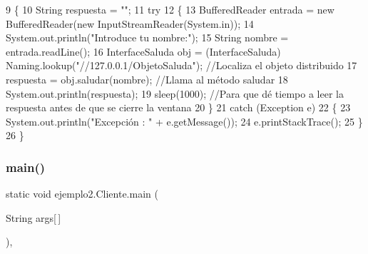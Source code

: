 \begin{DoxyCode}
9     \{
10         String respuesta = \textcolor{stringliteral}{""};
11         \textcolor{keywordflow}{try}
12         \{
13             BufferedReader entrada = \textcolor{keyword}{new} BufferedReader(\textcolor{keyword}{new} InputStreamReader(System.in));
14             System.out.println(\textcolor{stringliteral}{"Introduce tu nombre:"});
15             String nombre = entrada.readLine();
16             InterfaceSaluda obj = (InterfaceSaluda) Naming.lookup(\textcolor{stringliteral}{"//127.0.0.1/ObjetoSaluda"}); \textcolor{comment}{//Localiza
       el objeto distribuido}
17             respuesta = obj.saludar(nombre);                                                   \textcolor{comment}{//Llama al
       método saludar}
18             System.out.println(respuesta);
19             sleep(1000); \textcolor{comment}{//Para que dé tiempo a leer la respuesta antes de que se cierre la ventana}
20         \}
21         \textcolor{keywordflow}{catch} (Exception e)
22         \{
23             System.out.println(\textcolor{stringliteral}{"Excepción : "} + e.getMessage());
24             e.printStackTrace();
25         \}
26     \}
\end{DoxyCode}
\mbox{\label{classejemplo2_1_1_cliente_aefe0b8e5b3bae99a9bd00f3dedda11e2}} 
\subsubsection{\texorpdfstring{main()}{main()}\hspace{0.1cm}{\footnotesize\ttfamily [2/2]}}
{\footnotesize\ttfamily static void ejemplo2.\+Cliente.\+main (\begin{DoxyParamCaption}\item[{String}]{args\mbox{[}$\,$\mbox{]} }\end{DoxyParamCaption})\hspace{0.3cm}{\ttfamily [inline]}, {\ttfamily [static]}}


